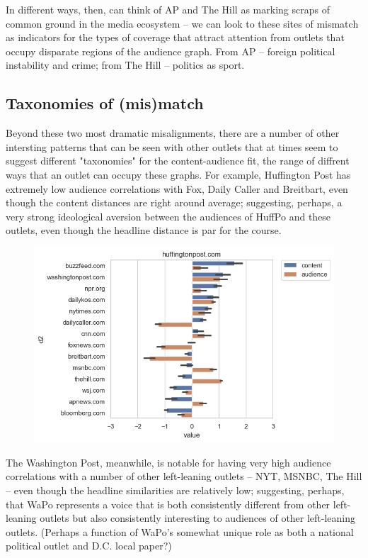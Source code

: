 \documentclass{scrartcl}
\begin{document}
In different ways, then, can think of AP and The Hill as marking scraps of common ground in the media ecosystem -- we can look to these sites of mismatch as indicators for the types of coverage that attract attention from outlets that occupy disparate regions of the audience graph. From AP -- foreign political instability and crime; from The Hill -- politics as sport.

\subsection{Taxonomies of (mis)match}

Beyond these two most dramatic misalignments, there are a number of other intersting patterns that can be seen with other outlets that at times seem to suggest different "taxonomies" for the content-audience fit, the range of diffrent ways that an outlet can occupy these graphs. For example, Huffington Post has extremely low audience correlations with Fox, Daily Caller and Breitbart, even though the content distances are right around average; suggesting, perhaps, a very strong ideological aversion between the audiences of HuffPo and these outlets, even though the headline distance is par for the course.

\begin{figure}[H]
  \centering
  \includegraphics[width=\textwidth]{figures/ca-huffingtonpost-composite.png}
\end{figure}

The Washington Post, meanwhile, is notable for having very high audience correlations with a number of other left-leaning outlets -- NYT, MSNBC, The Hill -- even though the headline similarities are relatively low; suggesting, perhaps, that WaPo represents a voice that is both consistently different from other left-leaning outlets but also consistently interesting to audiences of other left-leaning outlets. (Perhaps a function of WaPo's somewhat unique role as both a national political outlet and D.C. local paper?)
\end{document}
